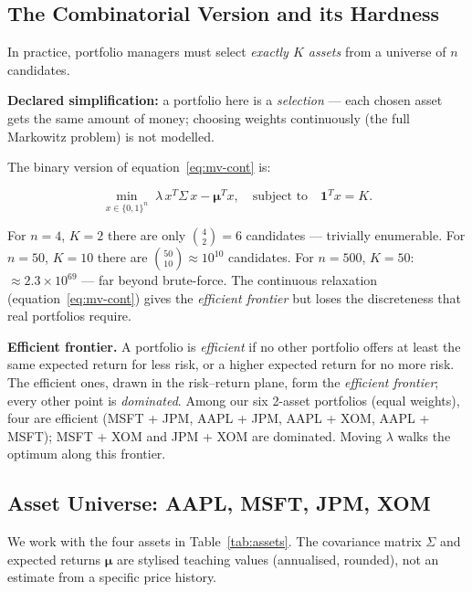 \documentclass[a4paper,11pt]{article}
\begin{document}
\subsection{The Combinatorial Version and its Hardness}

In practice, portfolio managers must select \emph{exactly $K$ assets}
from a universe of $n$ candidates.

\noindent\textbf{Declared simplification:} a portfolio here is a
\emph{selection} --- each chosen asset gets the same amount of money;
choosing weights continuously (the full Markowitz problem) is not modelled.

\noindent The binary version of equation~\eqref{eq:mv-cont} is:

\begin{equation}
    \min_{x \in \{0,1\}^n}\; \lambda\, x^T \Sigma\, x
    - \boldsymbol\mu^T x,
    \quad\text{subject to}\quad \mathbf{1}^T x = K.
    \label{eq:mv-binary}
\end{equation}

For $n=4$, $K=2$ there are only $\binom{4}{2} = 6$ candidates — trivially
enumerable. For $n=50$, $K=10$ there are $\binom{50}{10} \approx 10^{10}$
candidates. For $n=500$, $K=50$: $\approx 2.3 \times 10^{69}$ — far beyond brute-force.
The continuous relaxation (equation~\eqref{eq:mv-cont}) gives the
\emph{efficient frontier} but loses the discreteness that real portfolios
require.

\noindent\textbf{Efficient frontier.} A portfolio is \emph{efficient} if no
other portfolio offers at least the same expected return for less risk, or a
higher expected return for no more risk.
The efficient ones, drawn in the risk--return plane, form the
\emph{efficient frontier}; every other point is \emph{dominated}. Among our
six 2-asset portfolios (equal weights), four are efficient (MSFT + JPM,
AAPL + JPM, AAPL + XOM, AAPL + MSFT); MSFT + XOM and JPM + XOM are
dominated. Moving $\lambda$ walks the optimum along this frontier.

\subsection{Asset Universe: AAPL, MSFT, JPM, XOM}

We work with the four assets in Table~\ref{tab:assets}. The covariance
matrix $\Sigma$ and expected returns $\boldsymbol\mu$ are stylised teaching
values (annualised, rounded), not an estimate from a specific price history.
\end{document}

